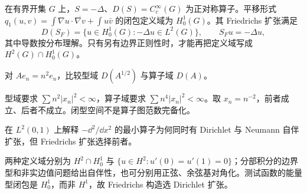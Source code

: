 \begin{example}[最小 Laplace 算子]
在有界开集 $G$ 上，$S=-\Delta$、$D(S)=C_c^\infty(G)$ 为正对称算子。平移形式 $q_1(u,v)=\int\nabla u\cdot\overline{\nabla v}+\int u\bar v$ 的闭包定义域为 $H_0^1(G)$。其 Friedrichs 扩张满足
\[
 D(S_F)=\{u\in H_0^1(G):-\Delta u\in L^2(G)\},\qquad S_Fu=-\Delta u,
\]
其中导数按分布理解。只有另有边界正则性时，才能再把定义域写成 $H^2(G)\cap H_0^1(G)$。
\end{example}

\begin{exercise}[型范数与图范数]\label{ex:y11-form-graph}
对 $Ae_n=n^2e_n$，比较型域 $D(A^{1/2})$ 与算子域 $D(A)$。
\end{exercise}
\begin{solution}
型域要求 $\sum n^2|x_n|^2<\infty$，算子域要求 $\sum n^4|x_n|^2<\infty$。取 $x_n=n^{-2}$，前者成立、后者不成立。闭型空间不是算子图范数完备化。
\end{solution}

\begin{exercise}[扩张不唯一]\label{ex:y11-friedrichs-nonunique}
在 $L^2(0,1)$ 上解释 $-\dd^2/\dd x^2$ 的最小算子为何同时有 Dirichlet 与 Neumann 自伴扩张，但 Friedrichs 扩张选择前者。
\end{exercise}
\begin{solution}
两种定义域分别为 $H^2\cap H_0^1$ 与 $\{u\in H^2:u'(0)=u'(1)=0\}$；分部积分的边界型和非实边值问题给出自伴性，也可分别用正弦、余弦基对角化。测试函数的能量型闭包是 $H_0^1$，而非 $H^1$，故 Friedrichs 构造选 Dirichlet 扩张。
\end{solution}
